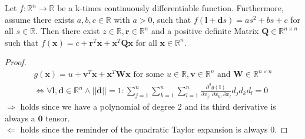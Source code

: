 \begin{lemma_ap}
	Let $f: \mathbb{R}^n \rightarrow \mathbb{R}$ be a k-times continuously differentiable function. Furthermore, assume there exists $a,b,c \in \mathbb{R}$ with $a>0$, such that $f(\mathbf{l}+\mathbf{d}s)= as^2+bs+c$ for all $s \in \mathbb{R}$. Then there exist $z \in \mathbb{R}, \mathbf{r} \in \mathbb{R}^n$ and a positive definite Matrix $\mathbf{Q}\in \mathbb{R}^{n\times n}$ such that $f(\mathbf{x})= c+\mathbf{r}^T\mathbf{x}+\mathbf{x}^T\mathbf{Q}\mathbf{x}$ for all $\mathbf{x} \in \mathbb{R}^n$.
\end{lemma_ap}
\begin{proof}
\begin{equation}
\begin{aligned}
 g(\mathbf{x})= u+\mathbf{v}^T\mathbf{x}+\mathbf{x}^T\mathbf{W}\mathbf{x} \text{ for some } u\in \mathbb{R}, \mathbf{v}\in \mathbb{R}^n \text{ and } \mathbf{W} \in \mathbb{R}^{n\times n} \\ \Leftrightarrow \forall \mathbf{l},\mathbf{d} \in \mathbb{R}^n \land ||\mathbf{d}||=1 : \sum\limits_{j=1}^{n}\sum\limits_{k=1}^{n}\sum\limits_{l=1}^{n} \frac{\partial^3 g(\mathbf{l}) }{\partial x_j,\partial x_k,\partial x_l}d_{j}d_{k}d_{l}=0
 \end{aligned}
\end{equation}
$\Rightarrow$ holds since we have a polynomial of degree 2 and its third derivative is always a $\mathbf{0}$ tensor.\\
$\Leftarrow$ holds since the reminder of the quadratic Taylor expansion is always 0.



\end{proof}
